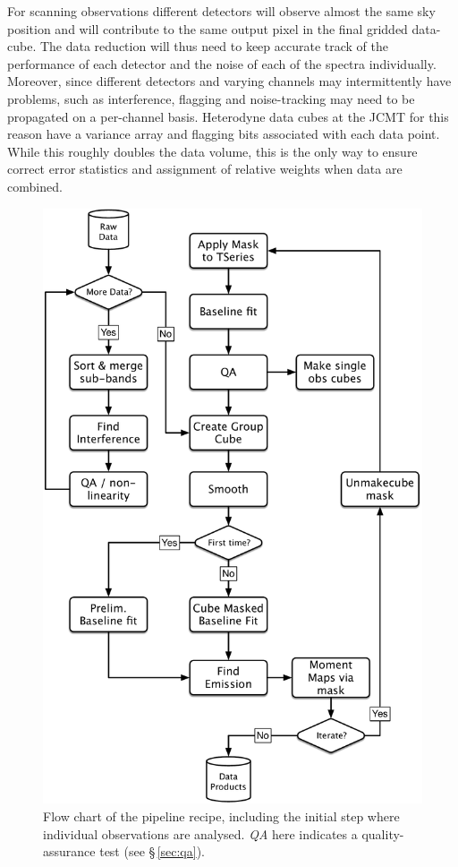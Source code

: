 \documentclass[final,authoryear,5p,times,twocolumn]{elsarticle}
\begin{document}
For scanning observations different detectors will observe almost
the same sky position and will contribute to the same output pixel in
the final gridded data-cube. The data reduction will thus need to keep
accurate track of the performance of each detector and the noise of
each of the spectra individually. Moreover, since different detectors
and varying channels may intermittently have problems, such as
interference, flagging and noise-tracking may need to be propagated on a
per-channel basis. Heterodyne data cubes at the JCMT for this reason
have a variance array and flagging bits associated with each data point.
While this roughly doubles the data volume, this is the only way to
ensure correct error statistics and assignment of relative weights
when data are combined.

\begin{figure}[t]
\includegraphics[width=\columnwidth]{flowchart}
\caption{Flow chart of the pipeline recipe, including the initial step
  where individual observations are analysed. \emph{QA} here indicates
  a quality-assurance test (see \S\,\ref{sec:qa}).
}
\label{fig:flowchart}
\end{figure}
\end{document}
